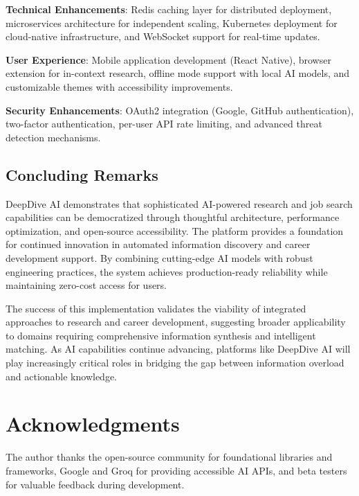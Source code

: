 \documentclass[conference]{IEEEtran}
\begin{document}
\textbf{Technical Enhancements}: Redis caching layer for distributed deployment, microservices architecture for independent scaling, Kubernetes deployment for cloud-native infrastructure, and WebSocket support for real-time updates.

\textbf{User Experience}: Mobile application development (React Native), browser extension for in-context research, offline mode support with local AI models, and customizable themes with accessibility improvements.

\textbf{Security Enhancements}: OAuth2 integration (Google, GitHub authentication), two-factor authentication, per-user API rate limiting, and advanced threat detection mechanisms.

\subsection{Concluding Remarks}

DeepDive AI demonstrates that sophisticated AI-powered research and job search capabilities can be democratized through thoughtful architecture, performance optimization, and open-source accessibility. The platform provides a foundation for continued innovation in automated information discovery and career development support. By combining cutting-edge AI models with robust engineering practices, the system achieves production-ready reliability while maintaining zero-cost access for users.

The success of this implementation validates the viability of integrated approaches to research and career development, suggesting broader applicability to domains requiring comprehensive information synthesis and intelligent matching. As AI capabilities continue advancing, platforms like DeepDive AI will play increasingly critical roles in bridging the gap between information overload and actionable knowledge.

\section*{Acknowledgments}
The author thanks the open-source community for foundational libraries and frameworks, Google and Groq for providing accessible AI APIs, and beta testers for valuable feedback during development.
\end{document}
